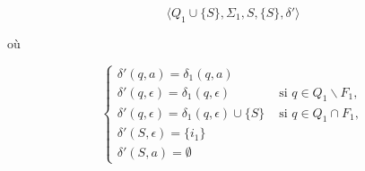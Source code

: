 \documentclass{article}[11pt]
\theoremstyle{definition}
\begin{document}
\[
\big \langle Q_1 \cup \{S\} ,\Sigma_1,S,\{S\},\delta' \big \rangle
\]

où

\[
\begin{cases}
\delta'(q,a) = \delta_1(q,a) &\\[1ex]

\delta'(q,\epsilon) = \delta_1(q,\epsilon) &\text{ si } q \in Q_1 \backslash F_1,\\[1ex]
\delta'(q,\epsilon) = \delta_1(q,\epsilon) \cup \{S\} &\text{ si } q \in Q_1 \cap F_1,\\[1ex]
\delta'(S,\epsilon) = \{i_1\}&\\[1ex]
\delta'(S,a) = \emptyset&
 \end{cases}
\]
\end{document}
